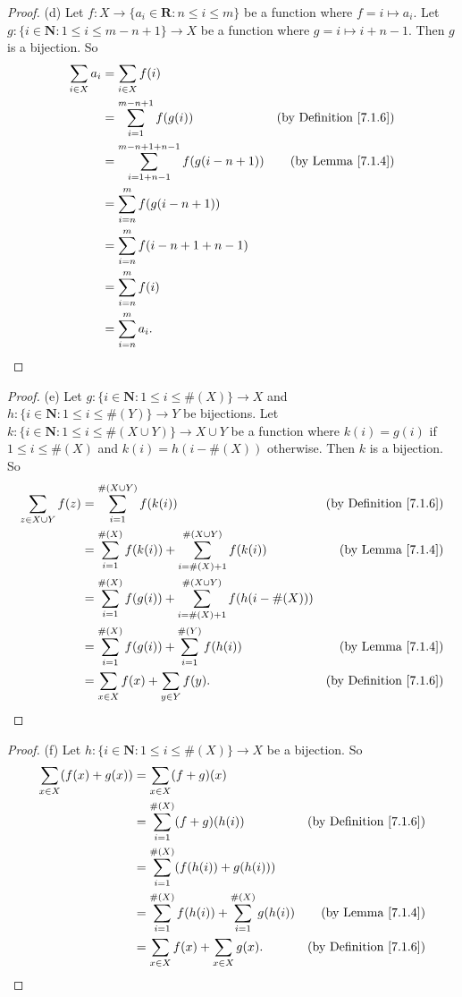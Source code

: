 \begin{proof}{(d)}
Let \(f : X \to \{a_i \in \mathbf{R} : n \leq i \leq m\}\) be a function where \(f = i \mapsto a_i\).
Let \(g : \{i \in \mathbf{N} : 1 \leq i \leq m - n + 1\} \to X\) be a function where \(g = i \mapsto i + n - 1\).
Then \(g\) is a bijection.
So
\begin{align*}
\sum_{i \in X} a_i &= \sum_{i \in X} f(i) \\
&= \sum_{i = 1}^{m - n + 1} f(g(i)) & \text{(by Definition \ref{7.1.6})} \\
&= \sum_{i = 1 + n - 1}^{m - n + 1 + n - 1} f(g(i - n + 1)) & \text{(by Lemma \ref{7.1.4})} \\
&= \sum_{i = n}^m f(g(i - n + 1)) \\
&= \sum_{i = n}^m f(i - n + 1 + n - 1) \\
&= \sum_{i = n}^m f(i) \\
&= \sum_{i = n}^m a_i.
\end{align*}
\end{proof}

\begin{proof}{(e)}
Let \(g : \{i \in \mathbf{N} : 1 \leq i \leq \#(X)\} \to X\) and \(h : \{i \in \mathbf{N} : 1 \leq i \leq \#(Y)\} \to Y\) be bijections.
Let \(k : \{i \in \mathbf{N} : 1 \leq i \leq \#(X \cup Y)\} \to X \cup Y\) be a function where \(k(i) = g(i)\) if \(1 \leq i \leq \#(X)\) and \(k(i) = h(i - \#(X))\) otherwise.
Then \(k\) is a bijection.
So
\begin{align*}
\sum_{z \in X \cup Y} f(z) &= \sum_{i = 1}^{\#(X \cup Y)} f(k(i)) & \text{(by Definition \ref{7.1.6})} \\
&= \sum_{i = 1}^{\#(X)} f(k(i)) + \sum_{i = \#(X) + 1}^{\#(X \cup Y)} f(k(i)) & \text{(by Lemma \ref{7.1.4})} \\
&= \sum_{i = 1}^{\#(X)} f(g(i)) + \sum_{i = \#(X) + 1}^{\#(X \cup Y)} f(h(i - \#(X))) \\
&= \sum_{i = 1}^{\#(X)} f(g(i)) + \sum_{i = 1}^{\#(Y)} f(h(i)) & \text{(by Lemma \ref{7.1.4})} \\
&= \sum_{x \in X} f(x) + \sum_{y \in Y} f(y). & \text{(by Definition \ref{7.1.6})}
\end{align*}
\end{proof}

\begin{proof}{(f)}
Let \(h : \{i \in \mathbf{N} : 1 \leq i \leq \#(X)\} \to X\) be a bijection.
So
\begin{align*}
\sum_{x \in X} (f(x) + g(x)) &= \sum_{x \in X} (f + g)(x) \\
&= \sum_{i = 1}^{\#(X)} (f + g)(h(i)) & \text{(by Definition \ref{7.1.6})} \\
&= \sum_{i = 1}^{\#(X)} (f(h(i)) + g(h(i))) \\
&= \sum_{i = 1}^{\#(X)} f(h(i)) + \sum_{i = 1}^{\#(X)} g(h(i)) & \text{(by Lemma \ref{7.1.4})} \\
&= \sum_{x \in X} f(x) + \sum_{x \in X} g(x). & \text{(by Definition \ref{7.1.6})}
\end{align*}
\end{proof}

